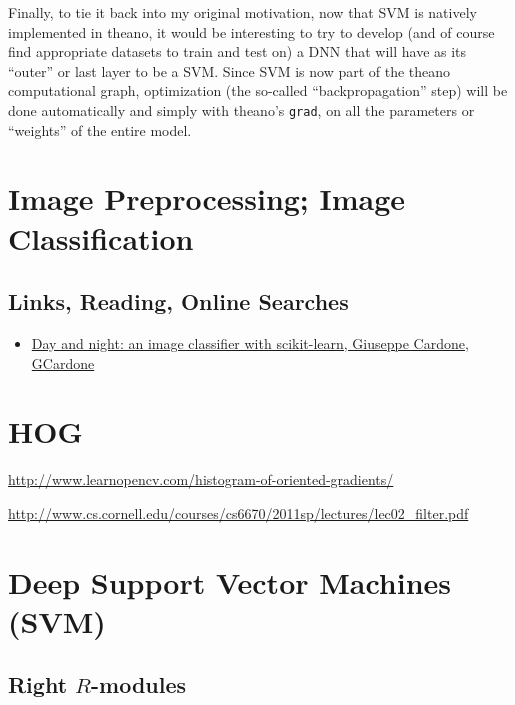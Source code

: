 \documentclass[10pt]{amsart}
\begin{document}
\begin{multicols*}{2}
Finally, to tie it back into my original motivation, now that SVM is natively implemented in theano, it would be interesting to try to develop (and of course find appropriate datasets to train and test on) a DNN that will have as its ``outer'' or last layer to be a SVM.  Since SVM is now part of the theano computational graph, optimization (the so-called ``backpropagation'' step) will be done automatically and simply with theano's \verb|grad|, on all the parameters or ``weights'' of the entire model.  

\section{Image Preprocessing; Image Classification}

\subsection{Links, Reading, Online Searches}

\begin{itemize}
\item \href{http://www.ippatsuman.com/2014/08/13/day-and-night-an-image-classifier-with-scikit-learn/}{Day and night: an image classifier with scikit-learn, Giuseppe Cardone, GCardone}
  \end{itemize}

\section{HOG}

\url{http://www.learnopencv.com/histogram-of-oriented-gradients/}

\url{http://www.cs.cornell.edu/courses/cs6670/2011sp/lectures/lec02_filter.pdf}


\section{Deep Support Vector Machines (SVM)}

\subsection{Right $R$-modules}


\end{multicols*}
\end{document}
